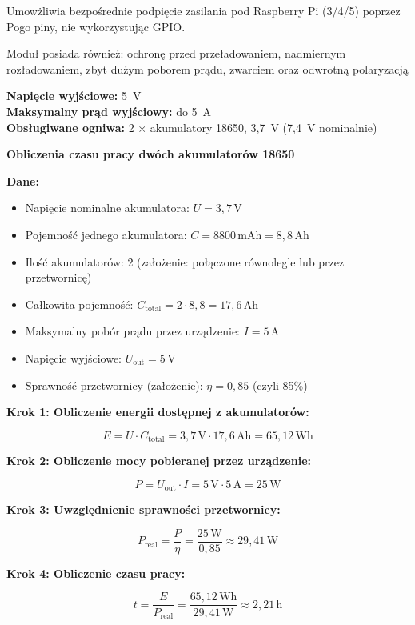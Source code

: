 \documentclass[magisterska]{pracadypl}
\begin{document}
Umowżliwia bezpośrednie podpięcie zasilania pod Raspberry Pi (3/4/5) poprzez Pogo piny, nie wykorzystując GPIO.

Moduł posiada również: ochronę przed przeładowaniem, nadmiernym rozładowaniem, zbyt dużym poborem prądu, zwarciem oraz odwrotną polaryzacją

\textbf{Napięcie wyjściowe:} 5~V \\
\textbf{Maksymalny prąd wyjściowy:} do 5~A \\
\textbf{Obsługiwane ogniwa:} 2 × akumulatory 18650, 3{,}7~V (7{,}4~V nominalnie)

\textbf{Obliczenia czasu pracy dwóch akumulatorów 18650}

\textbf{Dane:}
\begin{itemize}
  \item Napięcie nominalne akumulatora: $U = 3{,}7\,\mathrm{V}$
  \item Pojemność jednego akumulatora: $C = 8800\,\mathrm{mAh} = 8{,}8\,\mathrm{Ah}$
  \item Ilość akumulatorów: 2 (założenie: połączone równolegle lub przez przetwornicę)
  \item Całkowita pojemność: $C_{\text{total}} = 2 \cdot 8{,}8 = 17{,}6\,\mathrm{Ah}$
  \item Maksymalny pobór prądu przez urządzenie: $I = 5\,\mathrm{A}$
  \item Napięcie wyjściowe: $U_{\text{out}} = 5\,\mathrm{V}$
  \item Sprawność przetwornicy (założenie): $\eta = 0{,}85$ (czyli 85\%)
\end{itemize}

\textbf{Krok 1: Obliczenie energii dostępnej z akumulatorów:}

\[
E = U \cdot C_{\text{total}} = 3{,}7\,\mathrm{V} \cdot 17{,}6\,\mathrm{Ah} = 65{,}12\,\mathrm{Wh}
\]

\textbf{Krok 2: Obliczenie mocy pobieranej przez urządzenie:}

\[
P = U_{\text{out}} \cdot I = 5\,\mathrm{V} \cdot 5\,\mathrm{A} = 25\,\mathrm{W}
\]

\textbf{Krok 3: Uwzględnienie sprawności przetwornicy:}

\[
P_{\text{real}} = \frac{P}{\eta} = \frac{25\,\mathrm{W}}{0{,}85} \approx 29{,}41\,\mathrm{W}
\]

\textbf{Krok 4: Obliczenie czasu pracy:}

\[
t = \frac{E}{P_{\text{real}}} = \frac{65{,}12\,\mathrm{Wh}}{29{,}41\,\mathrm{W}} \approx 2{,}21\,\mathrm{h}
\]
\end{document}
